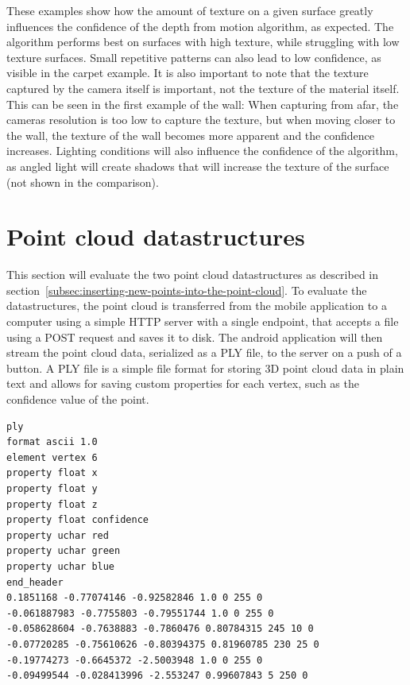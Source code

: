 These examples show how the amount of texture on a given surface greatly influences the confidence of the depth from motion algorithm, as expected.
The algorithm performs best on surfaces with high texture, while struggling with low texture surfaces.
Small repetitive patterns can also lead to low confidence, as visible in the carpet example.
It is also important to note that the texture captured by the camera itself is important, not the texture of the material itself.
This can be seen in the first example of the wall: When capturing from afar, the cameras resolution is too low to capture the texture,
but when moving closer to the wall, the texture of the wall becomes more apparent and the confidence increases.
Lighting conditions will also influence the confidence of the algorithm,
as angled light will create shadows that will increase the texture of the surface~\cite{google_llc_arcore_doc} (not shown in the comparison).

\section{Point cloud datastructures}\label{sec:point-cloud-datastructures}
This section will evaluate the two point cloud datastructures as described in section~\ref{subsec:inserting-new-points-into-the-point-cloud}.
To evaluate the datastructures, the point cloud is transferred from the mobile application to a computer using
a simple HTTP server with a single endpoint, that accepts a file using a POST request and saves it to disk.
The android application will then stream the point cloud data, serialized as a PLY file, to the server on a push of a button.
A PLY file is a simple file format for storing 3D point cloud data in plain text
and allows for saving custom properties for each vertex, such as the confidence value of the point.

\begin{lstlisting}[caption=Example PLY file]
ply
format ascii 1.0
element vertex 6
property float x
property float y
property float z
property float confidence
property uchar red
property uchar green
property uchar blue
end_header
0.1851168 -0.77074146 -0.92582846 1.0 0 255 0
-0.061887983 -0.7755803 -0.79551744 1.0 0 255 0
-0.058628604 -0.7638883 -0.7860476 0.80784315 245 10 0
-0.07720285 -0.75610626 -0.80394375 0.81960785 230 25 0
-0.19774273 -0.6645372 -2.5003948 1.0 0 255 0
-0.09499544 -0.028413996 -2.553247 0.99607843 5 250 0
\end{lstlisting}

%
%


